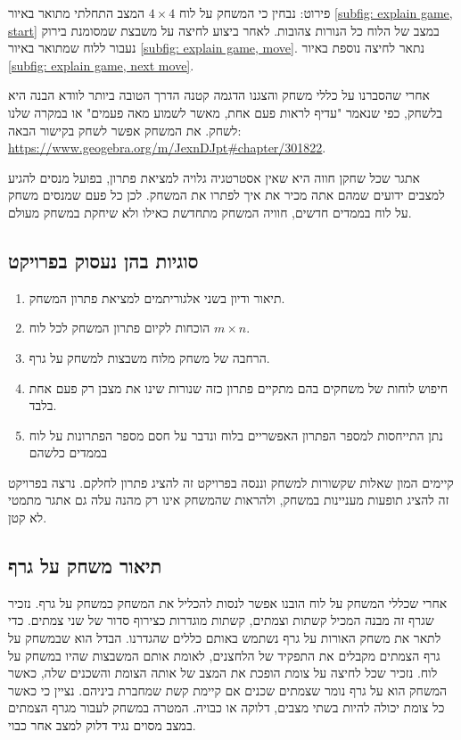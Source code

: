 \documentclass[12pt,leqno]{article}
\theoremstyle{theoremdd}
\begin{document}
פירוט:
נבחין כי המשחק 
על לוח
$4 \times 4$
המצב התחלתי מתואר
באיור
\ref{subfig: explain game, start}
במצב של הלוח
כל הנורות צהובות.
לאחר ביצוע לחיצה על משבצת שמסומנת בירוק נעבור ללוח שמתואר באיור 
\ref{subfig: explain game, move}.
נתאר לחיצה נוספת באיור 
\ref{subfig: explain game, next move}.

אחרי שהסברנו על כללי משחק והצגנו הדגמה קטנה הדרך הטובה ביותר לוודא הבנה היא בלשחק,
כפי שנאמר "עדיף לראות פעם אחת, מאשר לשמוע מאה פעמים"
או במקרה שלנו לשחק.
את המשחק אפשר לשחק בקישור הבאה:
\url{https://www.geogebra.org/m/JexnDJpt#chapter/301822}.

אתגר שכל שחקן חווה היא 
שאין אסטרטגיה גלויה למציאת פתרון, בפועל מנסים להגיע למצבים ידועים
שמהם אתה מכיר את איך לפתרו את המשחק. 
לכן כל פעם שמנסים משחק על לוח בממדים חדשים, חוויה
המשחק מתחדשת כאילו ולא שיחקת במשחק מעולם.

\subsection{סוגיות בהן נעסוק בפרויקט}
\begin{enumerate}
	\item 
	תיאור ודיון בשני אלגוריתמים למציאת פתרון המשחק.
	\item 
	הוכחות לקיום פתרון המשחק לכל לוח
	$m\times n$.
	\item 
	הרחבה של משחק מלוח משבצות למשחק על גרף.
	\item 
    חיפוש לוחות של משחקים בהם מתקיים פתרון כזה שנורות שינו את מצבן רק פעם אחת בלבד.
    \item 
    נתן התייחסות למספר הפתרון האפשריים בלוח ונדבר על חסם מספר הפתרונות על לוח בממדים כלשהם
\end{enumerate}

קיימים המון שאלות שקשורות למשחק וננסה בפרויקט זה להציג פתרון לחלקם.
נרצה בפרויקט זה להציג תופעות מעניינות במשחק, ולהראות
שהמשחק אינו רק מהנה עלה גם אתגר מתמטי לא קטן.

\subsection{תיאור משחק על גרף}
אחרי שכללי המשחק על לוח הובנו אפשר לנסות להכליל את המשחק כמשחק על גרף.
נזכיר שגרף זה מבנה המכיל קשתות וצמתים, קשתות מוגדרות כצירוף סדור של שני צמתים.
כדי לתאר את משחק האורות על גרף נשתמש באותם כללים שהגדרנו.
הבדל הוא שבמשחק על גרף הצמתים מקבלים את התפקיד של הלחצנים, לאומת אותם המשבצות שהיו במשחק על לוח.
נזכיר שכל לחיצה על צומת הופכת את המצב של אותה הצומת והשכנים שלה,
כאשר המשחק הוא על גרף נומר שצמתים שכנים אם קיימת
קשת שמחברת ביניהם.
נציין כי כאשר כל צומת יכולה להיות בשתי מצבים,
דלוקה או כבויה.
המטרה במשחק לעבור מגרף הצמתים במצב מסוים נגיד דלוק למצב אחר כבוי.
\end{document}
